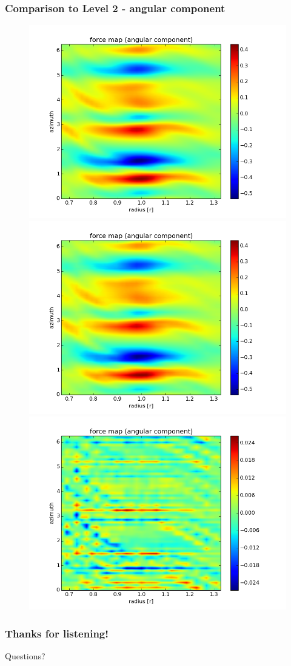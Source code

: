 \documentclass{beamer}
\begin{document}
\begin{frame}
 \frametitle{Comparison to Level 2 - angular component}
 \begin{figure}[H]
  \centering
  \includegraphics[width=.4\textwidth]{angular_pure_lvl2.png} \includegraphics[width=.4\textwidth]{angular_refined_lvl3.png} \\
  \includegraphics[width=.4\textwidth]{angular_puretorefined_diff2to3.png}
\end{figure}
\end{frame}
\begin{frame}
 \frametitle{Thanks for listening!}
 \begin{center}
  Questions?
 \end{center}
\end{frame}
\end{document}
